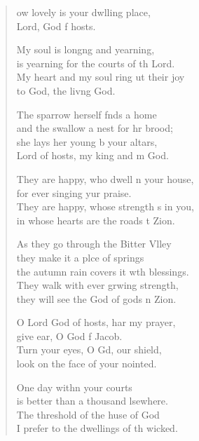 \settowidth{\versewidth}{They are happy, whose strength is in you, *}
\begin{verse}%
  \begin{patverse}
ow lovely is your dwlling place,\Med\\
Lord, God f hosts.

My soul is long\pointup{\i}ng and yearning,\Med\\
is yearning for the courts of th Lord.\\
My heart and my soul ring ut their joy\Med\\
to God, the liv\pointup{\i}ng God.

The sparrow herself f\pointup{\i}nds a home\Med\\
and the swallow a nest for hr brood;\\
she lays her young b your altars,\Med\\
Lord of hosts, my king and m God.

They are happy, who dwell \pointup{\i}n your house,\Med\\
for ever singing yur praise.\\
They are happy, whose strength \pointup{\i}s in you,\Med\\
in whose hearts are the roads t Zion.

As they go through the Bitter Vlley\Flex\\
they make it a plce of springs\Med\\
the autumn rain covers it w\pointup{\i}th blessings.\\
They walk with ever grwing strength,\Med\\
they will see the God of gods \pointup{\i}n Zion.

O Lord God of hosts, har my prayer,\Med\\
give ear, O God f Jacob.\\
Turn your eyes, O Gd, our shield,\Med\\
look on the face of your nointed.

One day with\pointup{\i}n your courts\Med\\
is better than a thousand lsewhere.\\
The threshold of the huse of God\Med\\
I prefer to the dwellings of th wicked.


\end{patverse}
\end{verse}
